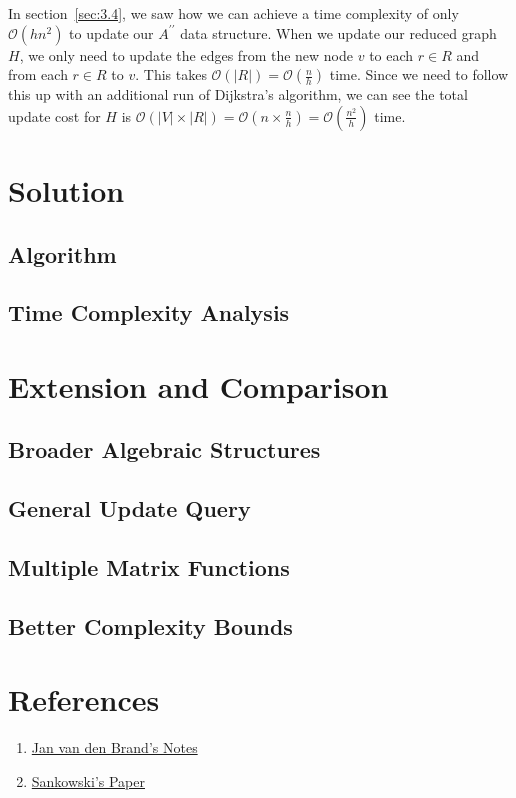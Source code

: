 \documentclass[12pt]{article}
\newcommand{\bigO}{\mathcal{O}}
\begin{document}
In section~\ref{sec:3.4}, we saw how we can achieve a time complexity of only $\bigO(h n^2)$ to update our $A^{\prime \prime}$ data structure. When we update our reduced graph $H$, we only need to update the edges from the new node $v$ to each $r \in R$ and from each $r \in R$ to $v$. This takes $\bigO(|R|) = \bigO(\frac{n}{h})$ time. Since we need to follow this up with an additional run of Dijkstra's algorithm, we can see the total update cost for $H$ is $\bigO(|V| \times |R|) = \bigO(n \times \frac{n}{h}) = \bigO(\frac{n^2}{h})$ time.

\section{Solution} \label{sec:4}
\subsection{Algorithm}
\subsection{Time Complexity Analysis}

\section{Extension and Comparison}
\subsection{Broader Algebraic Structures}
\subsection{General Update Query}
\subsection{Multiple Matrix Functions}
\subsection{Better Complexity Bounds}

\section*{References}

\begin{enumerate}
    \item \href{https://www.dropbox.com/scl/fi/zjfbk8dbxbzcn05dr8l11/fall22_daa_lecturenotes.pdf?rlkey=g6z7z1hvj7jknvlpy1s3dqcjw&e=1&st=13r18doq&dl=0}{Jan van den Brand's Notes}
    \item \href{https://www.dropbox.com/scl/fi/5w4k0lg0u8e36zugapp6c/Sankowski-COCOON-05-subquadratic-dynamic-distances.pdf?rlkey=5eahwsl7a49kwxyvlr7yqyoz3&e=2&st=d3zo7owc&dl=0}{Sankowski's Paper}
\end{enumerate}
\end{document}
